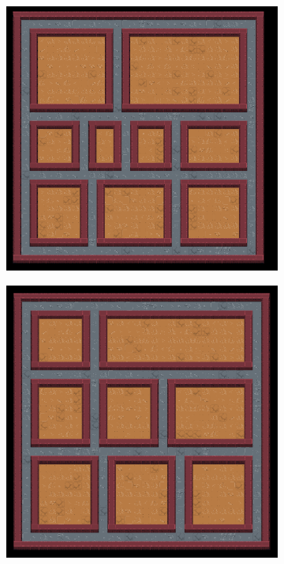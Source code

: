 \begin{figure}[H]
\begin{subfigure}{.5\textwidth}
  \label{fig:sfig2}
\end{subfigure}
\begin{subfigure}{.5\textwidth}
  \centering
  \includegraphics[width=.8\linewidth]{../images/pcg_images/pcg3.png}
  \label{fig:sfig1}
\end{subfigure}%
\begin{subfigure}{.5\textwidth}
  \centering
  \includegraphics[width=.8\linewidth]{../images/pcg_images/pcg4.png}
  \label{fig:sfig2}
\end{subfigure}
\begin{subfigure}{.5\textwidth}
  \centering

\end{subfigure}
\end{figure}
